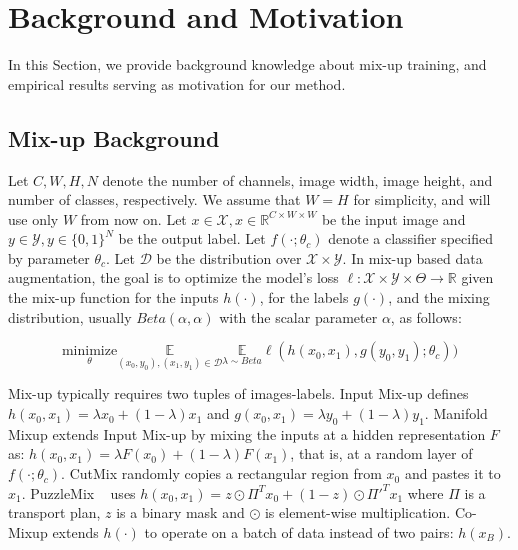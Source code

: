 \documentclass[letterpaper]{article} \usepackage[submission]{aaai23}  \usepackage{times}  \usepackage{helvet}  \usepackage{courier}  \usepackage[hyphens]{url}  \usepackage{graphicx} \urlstyle{rm} \def\UrlFont{\rm}  \usepackage{natbib}  \usepackage{caption} \frenchspacing  \setlength{\pdfpagewidth}{8.5in} \setlength{\pdfpageheight}{11in}
\newcommand{\mixup}{Input Mix-up}
\newcommand{\cutmix}{{CutMix}}
\newcommand{\puzzlemix}{{PuzzleMix}}
\newcommand{\comixup}{{Co-Mixup}}
\newcommand{\manifoldmixup}{{Manifold Mixup}}
\begin{document}
\section{Background and Motivation}
\label{sec:background}
In this Section, we provide background knowledge about mix-up training, and empirical results serving as motivation for our method.
\subsection{Mix-up Background}
Let $C, W, H, N$ denote the number of channels, image width, image height, and number of classes, respectively. We assume that $W = H$ for simplicity, and will use only $W$ from now on. Let $x \in \mathcal{X}, x \in \mathbb{R}^{C \times W \times W}$ be the input image and $y \in \mathcal{Y}, y \in \{0, 1\}^N$ be the output label. Let $f(\cdot;\theta_c)$ denote a classifier specified by parameter $\theta_c$. Let $\mathcal{D}$ be the distribution over $\mathcal{X} \times \mathcal{Y}$. In mix-up based data augmentation, the goal is to optimize the model's loss $\ell: \mathcal{X} \times \mathcal{Y} \times \Theta \rightarrow \mathbb{R}$ given the mix-up function for the inputs $h(\cdot)$, for the labels $g(\cdot)$, and the mixing distribution, usually $Beta(\alpha, \alpha)$ with the scalar parameter $\alpha$, as follows:

\begin{equation}
\label{objective}
    \underset{\theta}{\text{minimize}} \underset{(x_0, y_0), (x_1, y_1) \in \mathcal{D}}{\mathbb{E}} \underset{\lambda \sim Beta}{\mathbb{E}}\ell(h(x_0, x_1), g(y_0, y_1);\theta_c))
\end{equation}

Mix-up typically requires two tuples of images-labels. \mixup{} \cite{zhang2018mixup} defines $h(x_0, x_1) = \lambda x_0 + (1-\lambda) x_1$ and $g(x_0, x_1) = \lambda y_0 + (1-\lambda) y_1$. \manifoldmixup{} \cite{verma2019manifold} extends \mixup{} by mixing the inputs at a hidden representation $F$ as: $h(x_0, x_1) = \lambda F(x_0) + (1-\lambda) F(x_1)$, that is, at a random layer of $f(\cdot;\theta_c)$. \cutmix{} randomly copies a rectangular region from $x_0$ and pastes it to $x_1$. \puzzlemix{} ~\cite{kim2020puzzlemix} uses $h(x_0, x_1) = z \odot \Pi^T x_0 + (1-z) \odot \Pi'^T x_1$ where $\Pi$ is a transport plan, $z$ is a binary mask and $\odot$ is element-wise multiplication. \comixup{} \cite{kim2021comixup} extends $h(\cdot)$ to operate on a batch of data instead of two pairs: $h(x_B)$. 
\end{document}
